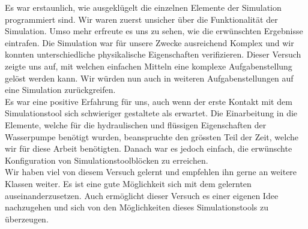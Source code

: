 Es war erstaunlich, wie ausgeklügelt die einzelnen Elemente der Simulation programmiert sind. Wir waren zuerst unsicher über die Funktionalität der Simulation. Umso mehr erfreute es uns zu sehen, wie die erwünschten Ergebnisse eintrafen. Die Simulation war für unsere Zwecke ausreichend Komplex und wir konnten unterschiedliche physikalische Eigenschaften verifizieren. Dieser Versuch zeigte uns auf, mit welchen einfachen Mitteln eine komplexe Aufgabenstellung gelöst werden kann. Wir würden nun auch in weiteren Aufgabenstellungen auf eine Simulation zurückgreifen.\\

Es war eine positive Erfahrung für uns, auch wenn der erste Kontakt mit dem Simulationstool sich schwieriger gestaltete als erwartet. Die Einarbeitung in die Elemente, welche für die hydraulischen und flüssigen Eigenschaften der Wasserpumpe benötigt wurden, beanspruchte den grössten Teil der Zeit, welche wir für diese Arbeit benötigten. Danach war es jedoch einfach, die erwünschte Konfiguration von Simulationstoolblöcken zu erreichen.\\

Wir haben viel von diesem Versuch gelernt und empfehlen ihn gerne an weitere Klassen weiter. Es ist eine gute Möglichkeit sich mit dem gelernten auseinanderzusetzen. Auch ermöglicht dieser Versuch es einer eigenen Idee nachzugehen und sich von den Möglichkeiten dieses Simulationstools zu überzeugen.
